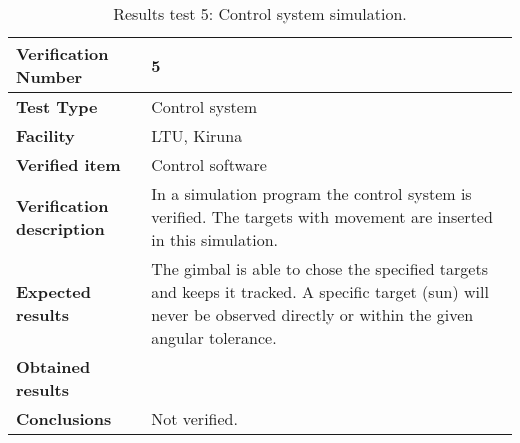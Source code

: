 \begin{table}[H]
\centering

\begin{tabular}{|m{}| m{} |}
\hline
\textbf{Verification Number} 		& 5 				\\ \hline
\textbf{Test Type} 					& Control system	\\ \hline
\textbf{Facility} 					& LTU, Kiruna 		\\ \hline
\textbf{Verified item} 				& Control software 	\\ \hline

\textbf{Verification description} 	& In a simulation program the control system is verified. The targets with movement are inserted in this simulation.\\ \hline

\textbf{Expected results} 			& The gimbal is able to chose the specified targets and keeps it tracked. A specific target (sun) will never be observed directly or within the given angular tolerance. \\ \hline

\textbf{Obtained results} 			& \\ \hline

\textbf{Conclusions} 				& Not verified.		\\ \hline
\end{tabular}
\caption{Results test 5: Control system simulation.}
\label{tab:testresult5:control}
\end{table}


\raggedbottom
